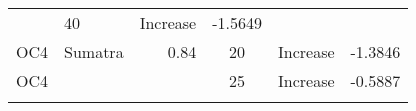 \documentclass[]{article}
\begin{document}
\begin{longtable}[]{@{}clrccr@{}}
\begin{minipage}[t]{0.11\columnwidth}
\strut
\end{minipage} & \begin{minipage}[t]{0.10\columnwidth}\centering\strut
40\strut
\end{minipage} & \begin{minipage}[t]{0.16\columnwidth}\centering\strut
Increase\strut
\end{minipage} & \begin{minipage}[t]{0.09\columnwidth}\raggedleft\strut
-1.5649\strut
\end{minipage}\tabularnewline
\begin{minipage}[t]{0.08\columnwidth}\centering\strut
OC4\strut
\end{minipage} & \begin{minipage}[t]{0.29\columnwidth}\raggedright\strut
Sumatra\strut
\end{minipage} & \begin{minipage}[t]{0.11\columnwidth}\raggedleft\strut
0.84\strut
\end{minipage} & \begin{minipage}[t]{0.10\columnwidth}\centering\strut
20\strut
\end{minipage} & \begin{minipage}[t]{0.16\columnwidth}\centering\strut
Increase\strut
\end{minipage} & \begin{minipage}[t]{0.09\columnwidth}\raggedleft\strut
-1.3846\strut
\end{minipage}\tabularnewline
\begin{minipage}[t]{0.08\columnwidth}\centering\strut
OC4\strut
\end{minipage} & \begin{minipage}[t]{0.29\columnwidth}\raggedright\strut
\strut
\end{minipage} & \begin{minipage}[t]{0.11\columnwidth}\raggedleft\strut
\strut
\end{minipage} & \begin{minipage}[t]{0.10\columnwidth}\centering\strut
25\strut
\end{minipage} & \begin{minipage}[t]{0.16\columnwidth}\centering\strut
Increase\strut
\end{minipage} & \begin{minipage}[t]{0.09\columnwidth}\raggedleft\strut
-0.5887\strut
\end{minipage}\tabularnewline
\begin{minipage}[t]{0.08\columnwidth}\centering\strut

\end{minipage}
\end{longtable}
\end{document}
